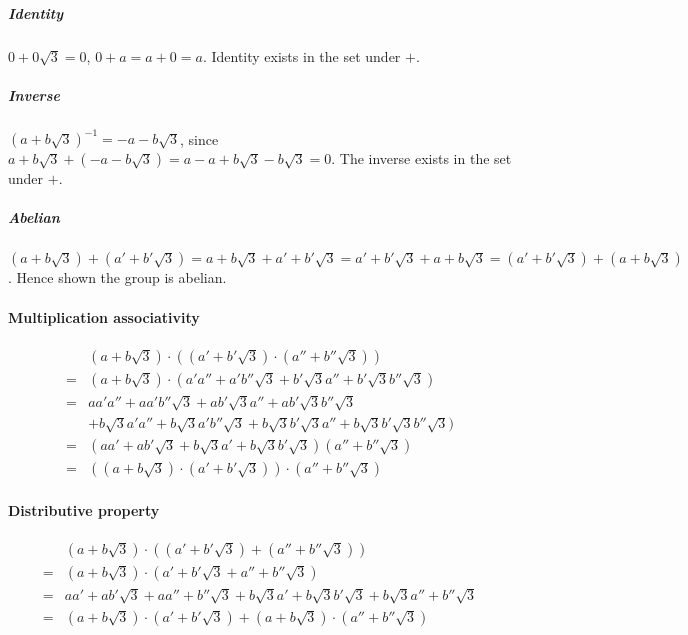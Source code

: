 \documentclass[12pt]{article}
\begin{document}
\begin{enumerate}
		\subparagraph{Identity}$0 + 0\sqrt{3}=0$, $0 + a = a+0 = a$. Identity
		exists in the set under $+$.

		\subparagraph{Inverse}$(a+b\sqrt{3})^{-1}=-a-b\sqrt{3}$, since
		$a+b\sqrt{3} + (-a-b\sqrt{3}) = a-a + b\sqrt{3} - b\sqrt{3} = 0$. The
		inverse exists in the set under $+$.

		\subparagraph{Abelian}$(a+b\sqrt{3}) + (a'+b'\sqrt{3}) = a+b\sqrt{3} +
		a'+b'\sqrt{3} = a'+b'\sqrt{3} + a+b\sqrt{3} = (a'+b'\sqrt{3}) +
		(a+b\sqrt{3})$. Hence shown the group is abelian.

		\paragraph{Multiplication associativity}
		\begin{align*}
			&(a+b\sqrt{3}) \cdot ((a'+b'\sqrt{3}) \cdot (a''+b''\sqrt{3})) \\
			=&(a + b\sqrt{3}) \cdot (a'a'' + a'b''\sqrt{3} + b'\sqrt{3}a'' +
			b'\sqrt{3}b''\sqrt{3}) \\
			=&aa'a'' + aa'b''\sqrt{3} + ab'\sqrt{3}a'' + ab'\sqrt{3}b''\sqrt{3} \\
			&+ b\sqrt{3}a'a'' + b\sqrt{3}a'b''\sqrt{3} + b\sqrt{3}b'\sqrt{3}a'' 
			+ b\sqrt{3}b'\sqrt{3}b''\sqrt{3})\\
			=&(aa' + ab'\sqrt{3}+b\sqrt{3}a' + b\sqrt{3}b'\sqrt{3})(a'' +
			b''\sqrt{3})\\
			=&((a+b\sqrt{3}) \cdot (a'+b'\sqrt{3})) \cdot (a''+b''\sqrt{3})
		\end{align*}

		\paragraph{Distributive property}
		\begin{align*}
			&(a+b\sqrt{3}) \cdot ((a'+b'\sqrt{3}) + (a''+b''\sqrt{3})) \\
			=&(a+b\sqrt{3}) \cdot (a'+b'\sqrt{3} + a''+b''\sqrt{3}) \\
			=&aa'+ab'\sqrt{3} + aa''+b''\sqrt{3} + b\sqrt{3}a'+b\sqrt{3}b'\sqrt{3} +
			b\sqrt{3}a''+b''\sqrt{3} \\
			=&(a+b\sqrt{3}) \cdot (a'+b'\sqrt{3}) + (a+b\sqrt{3}) \cdot (a''+b''\sqrt{3}) \\
		\end{align*}


\end{enumerate}
\end{document}
